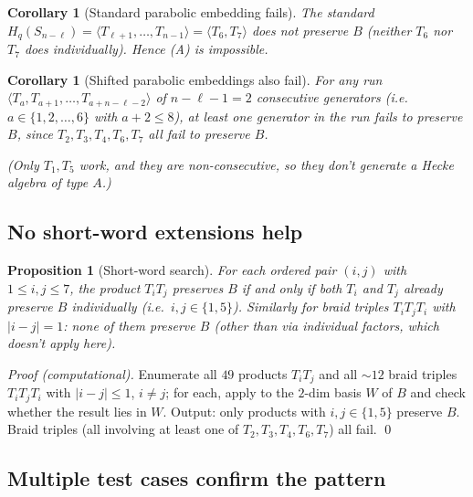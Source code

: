 \documentclass[11pt]{article}
\newtheorem{proposition}[theorem]{Proposition}
\newtheorem{corollary}[theorem]{Corollary}
\theoremstyle{definition}
\begin{document}
\begin{corollary}[Standard parabolic embedding fails]\label{cor:A-fail}
The standard $H_q(S_{n-\ell}) = \langle T_{\ell+1}, \ldots, T_{n-1}\rangle
= \langle T_6, T_7\rangle$ does \emph{not} preserve $B$ (neither
$T_6$ nor $T_7$ does individually). Hence (A) is impossible.
\end{corollary}

\begin{corollary}[Shifted parabolic embeddings also fail]\label{cor:B-fail}
For any run $\langle T_a, T_{a+1}, \ldots, T_{a + n - \ell - 2}\rangle$
of $n - \ell - 1 = 2$ consecutive generators (i.e.\ $a \in \{1, 2, \ldots, 6\}$
with $a + 2 \le 8$), at least one generator in the run fails to preserve
$B$, since $T_2, T_3, T_4, T_6, T_7$ all fail to preserve $B$.

(Only $T_1, T_5$ work, and they are non-consecutive, so they don't
generate a Hecke algebra of type $A$.)
\end{corollary}

\subsection{No short-word extensions help}

\begin{proposition}[Short-word search]\label{prop:short-words}
For each ordered pair $(i, j)$ with $1 \le i, j \le 7$, the product
$T_i T_j$ preserves $B$ if and only if both $T_i$ and $T_j$ already
preserve $B$ individually (i.e.\ $i, j \in \{1, 5\}$). Similarly for
braid triples $T_i T_j T_i$ with $|i - j| = 1$: none of them preserve
$B$ (other than via individual factors, which doesn't apply here).
\end{proposition}

\begin{proof}[Proof (computational)]
Enumerate all $49$ products $T_i T_j$ and all $\sim 12$ braid triples
$T_i T_j T_i$ with $|i - j| \le 1$, $i \ne j$; for each, apply to
the $2$-dim basis $W$ of $B$ and check whether the result lies in $W$.
Output: only products with $i, j \in \{1, 5\}$ preserve $B$. Braid
triples (all involving at least one of $T_2, T_3, T_4, T_6, T_7$) all
fail. \qed
\end{proof}

\subsection{Multiple test cases confirm the pattern}
\end{document}
